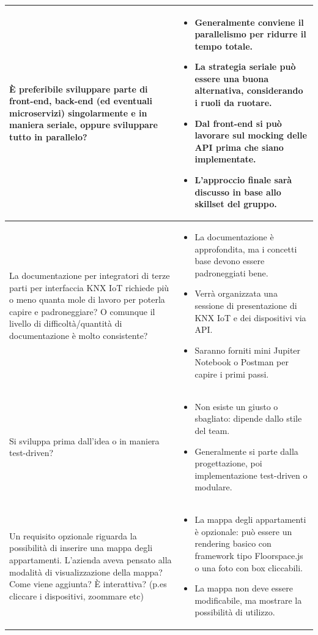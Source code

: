 \documentclass[a4paper,11pt]{article}
\begin{document}
{\begin{tabularx}{\textwidth}{|>{\raggedright\arraybackslash}X|>{\raggedright\arraybackslash}X|}
\hline
È preferibile sviluppare parte di front-end, back-end (ed eventuali microservizi) singolarmente e in maniera seriale, oppure sviluppare tutto in parallelo?
&
\begin{itemize}
\item Generalmente conviene il parallelismo per ridurre il tempo totale.
\item La strategia seriale può essere una buona alternativa, considerando i ruoli da ruotare.
\item Dal front-end si può lavorare sul mocking delle API prima che siano implementate.
\item L'approccio finale sarà discusso in base allo skillset del gruppo.
\end{itemize} \\
\hline
La documentazione per integratori di terze parti per interfaccia KNX IoT richiede più o meno quanta mole di lavoro per poterla capire e padroneggiare? O comunque il livello di difficoltà/quantità di documentazione è molto consistente?
&
\begin{itemize}
\item La documentazione è approfondita, ma i concetti base devono essere padroneggiati bene.
\item Verrà organizzata una sessione di presentazione di KNX IoT e dei dispositivi via API.
\item Saranno forniti mini Jupiter Notebook o Postman per capire i primi passi.
\end{itemize} \\
\hline
Si sviluppa prima dall'idea o in maniera test-driven?
&
\begin{itemize}
\item Non esiste un giusto o sbagliato: dipende dallo stile del team.
\item Generalmente si parte dalla progettazione, poi implementazione test-driven o modulare.
\end{itemize} \\
\hline
Un requisito opzionale riguarda la possibilità di inserire una mappa degli appartamenti. L'azienda aveva pensato alla modalità di visualizzazione della mappa? Come viene aggiunta? È interattiva? (p.es cliccare i dispositivi, zoommare etc)
&
\begin{itemize}
   \item La mappa degli appartamenti è opzionale: può essere un rendering basico con framework tipo Floorspace.js o una foto con box cliccabili.
  \item La mappa non deve essere modificabile, ma mostrare la possibilità di utilizzo.
\end{itemize}\\
\hline
\end{tabularx}
}
\end{document}
